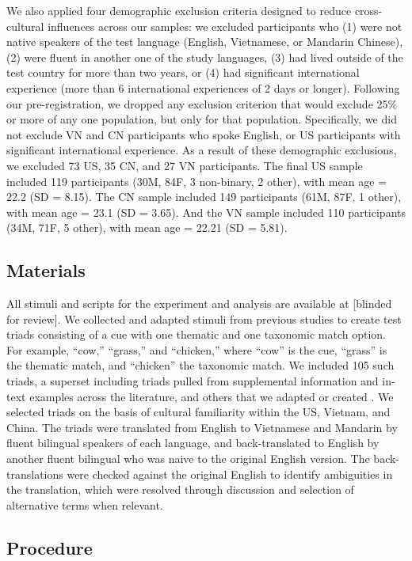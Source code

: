 \documentclass[10pt, letterpaper]{article}
\begin{document}
We also applied four demographic exclusion criteria designed to reduce
cross-cultural influences across our samples: we excluded participants
who (1) were not native speakers of the test language (English,
Vietnamese, or Mandarin Chinese), (2) were fluent in another one of the
study languages, (3) had lived outside of the test country for more than
two years, or (4) had significant international experience (more than 6
international experiences of 2 days or longer). Following our
pre-registration, we dropped any exclusion criterion that would exclude
25\% or more of any one population, but only for that population.
Specifically, we did not exclude VN and CN participants who spoke
English, or US participants with significant international experience.
As a result of these demographic exclusions, we excluded 73 US, 35 CN,
and 27 VN participants. The final US sample included 119 participants
(30M, 84F, 3 non-binary, 2 other), with mean age = 22.2 (SD = 8.15). The
CN sample included 149 participants (61M, 87F, 1 other), with mean age =
23.1 (SD = 3.65). And the VN sample included 110 participants (34M, 71F,
5 other), with mean age = 22.21 (SD = 5.81).

\hypertarget{materials}{%
\subsection{Materials}\label{materials}}

All stimuli and scripts for the experiment and analysis are available at
{[}blinded for review{]}. We collected and adapted stimuli from previous
studies to create test triads consisting of a cue with one thematic and
one taxonomic match option. For example, ``cow,'' ``grass,'' and
``chicken,'' where ``cow'' is the cue, ``grass'' is the thematic match,
and ``chicken'' the taxonomic match. We included 105 such triads, a
superset including triads pulled from supplemental information and
in-text examples across the literature, and others that we adapted or
created . We selected triads on the basis of cultural familiarity within
the US, Vietnam, and China. The triads were translated from English to
Vietnamese and Mandarin by fluent bilingual speakers of each language,
and back-translated to English by another fluent bilingual who was naive
to the original English version. The back-translations were checked
against the original English to identify ambiguities in the translation,
which were resolved through discussion and selection of alternative
terms when relevant.

\hypertarget{procedure}{%
\subsection{Procedure}\label{procedure}}
\end{document}
